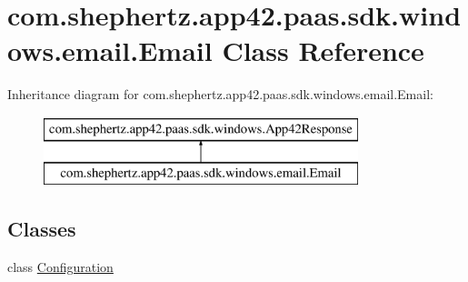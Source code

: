 \hypertarget{classcom_1_1shephertz_1_1app42_1_1paas_1_1sdk_1_1windows_1_1email_1_1_email}{\section{com.\+shephertz.\+app42.\+paas.\+sdk.\+windows.\+email.\+Email Class Reference}
\label{classcom_1_1shephertz_1_1app42_1_1paas_1_1sdk_1_1windows_1_1email_1_1_email}
}
Inheritance diagram for com.\+shephertz.\+app42.\+paas.\+sdk.\+windows.\+email.\+Email\+:\begin{figure}[H]
\begin{center}
\leavevmode
\includegraphics[height=2.000000cm]{classcom_1_1shephertz_1_1app42_1_1paas_1_1sdk_1_1windows_1_1email_1_1_email}
\end{center}
\end{figure}
\subsection*{Classes}
\begin{DoxyCompactItemize}
\item 
class \hyperlink{classcom_1_1shephertz_1_1app42_1_1paas_1_1sdk_1_1windows_1_1email_1_1_email_1_1_configuration}{Configuration}
\end{DoxyCompactItemize}

